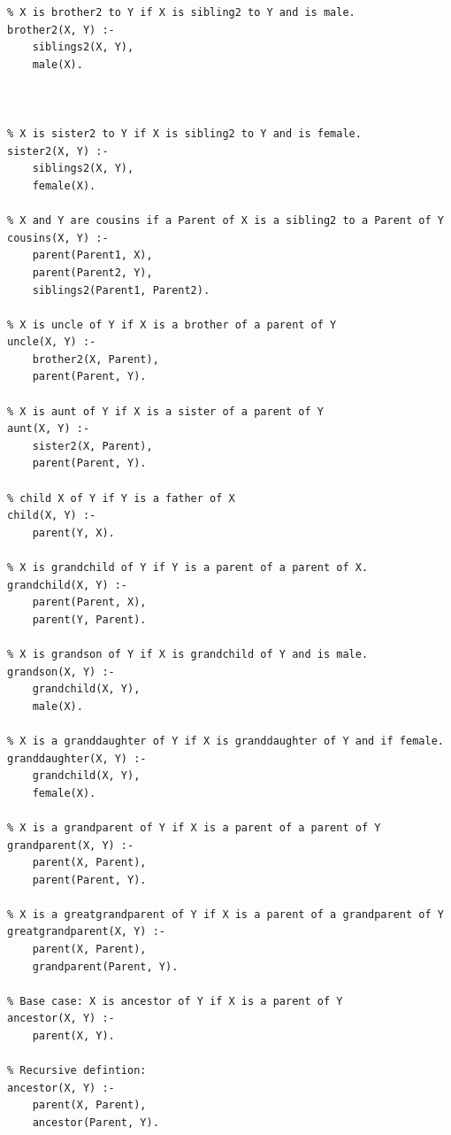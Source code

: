 \documentclass{article}
\begin{document}
\begin{verbatim}
% X is brother2 to Y if X is sibling2 to Y and is male.
brother2(X, Y) :-
    siblings2(X, Y),
    male(X).



% X is sister2 to Y if X is sibling2 to Y and is female.
sister2(X, Y) :-
    siblings2(X, Y),
    female(X).

% X and Y are cousins if a Parent of X is a sibling2 to a Parent of Y
cousins(X, Y) :-
    parent(Parent1, X),
    parent(Parent2, Y),
    siblings2(Parent1, Parent2).

% X is uncle of Y if X is a brother of a parent of Y
uncle(X, Y) :-
    brother2(X, Parent),
    parent(Parent, Y).

% X is aunt of Y if X is a sister of a parent of Y
aunt(X, Y) :-
    sister2(X, Parent),
    parent(Parent, Y).

% child X of Y if Y is a father of X
child(X, Y) :-
    parent(Y, X).

% X is grandchild of Y if Y is a parent of a parent of X.
grandchild(X, Y) :-
    parent(Parent, X),
    parent(Y, Parent).

% X is grandson of Y if X is grandchild of Y and is male.
grandson(X, Y) :-
    grandchild(X, Y),
    male(X).

% X is a granddaughter of Y if X is granddaughter of Y and if female.
granddaughter(X, Y) :-
    grandchild(X, Y),
    female(X).

% X is a grandparent of Y if X is a parent of a parent of Y
grandparent(X, Y) :-
    parent(X, Parent),
    parent(Parent, Y).

% X is a greatgrandparent of Y if X is a parent of a grandparent of Y
greatgrandparent(X, Y) :-
    parent(X, Parent),
    grandparent(Parent, Y).

% Base case: X is ancestor of Y if X is a parent of Y
ancestor(X, Y) :-
    parent(X, Y).

% Recursive defintion:
ancestor(X, Y) :-
    parent(X, Parent),
    ancestor(Parent, Y).

\end{verbatim}
	

\paragraph{}\
\paragraph{}\
\paragraph{}\
\end{document}
